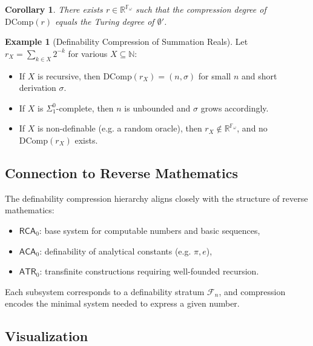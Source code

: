 \documentclass[12pt]{article}
\theoremstyle{definition}
\newtheorem{example}{Example}[section]
\theoremstyle{plain}
\newtheorem{corollary}[definition]{Corollary}
\theoremstyle{remark}
\begin{document}
\begin{corollary}
There exists \( r \in \mathbb{R}^{\mathbb{F}_\omega} \) such that the compression degree of \( \mathrm{DComp}(r) \) equals the Turing degree of \( \emptyset' \).
\end{corollary}

\begin{example}[Definability Compression of Summation Reals]
Let \( r_X = \sum_{k \in X} 2^{-k} \) for various \( X \subseteq \mathbb{N} \):
\begin{itemize}
    \item If \( X \) is recursive, then \( \mathrm{DComp}(r_X) = (n, \sigma) \) for small \( n \) and short derivation \( \sigma \).
    \item If \( X \) is \( \Sigma^0_1 \)-complete, then \( n \) is unbounded and \( \sigma \) grows accordingly.
    \item If \( X \) is non-definable (e.g. a random oracle), then \( r_X \notin \mathbb{R}^{\mathbb{F}_\omega} \), and no \( \mathrm{DComp}(r_X) \) exists.
\end{itemize}
\end{example}

\subsection*{Connection to Reverse Mathematics}

The definability compression hierarchy aligns closely with the structure of reverse mathematics:
\begin{itemize}
    \item \( \mathsf{RCA}_0 \): base system for computable numbers and basic sequences,
    \item \( \mathsf{ACA}_0 \): definability of analytical constants (e.g. \( \pi, e \)),
    \item \( \mathsf{ATR}_0 \): transfinite constructions requiring well-founded recursion.
\end{itemize}

Each subsystem corresponds to a definability stratum \( \mathcal{F}_n \), and compression encodes the minimal system needed to express a given number.

\subsection*{Visualization}

\begin{center}
\end{center}
\end{document}
